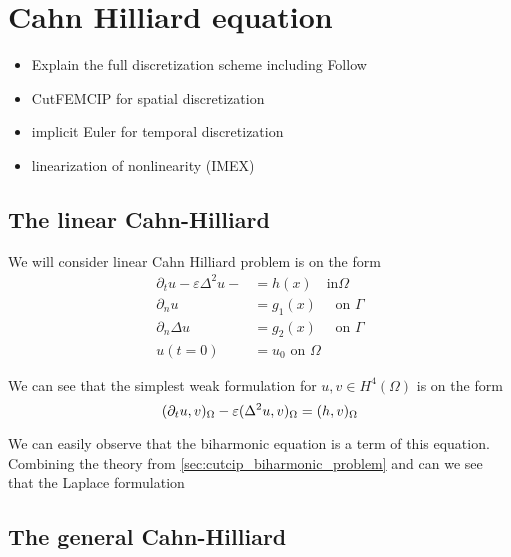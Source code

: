 
\newpage
\section{Cahn Hilliard equation }%
\label{sec:cahn_hilliard_equation}


\begin{itemize}
    \item Explain the full discretization scheme including Follow \cite{feng2007fully}
    \item CutFEMCIP for spatial discretization
    \item implicit Euler for temporal discretization
    \item linearization of nonlinearity (IMEX)
\end{itemize}


\subsection{The linear Cahn-Hilliard}%
\label{sub:the_problem}

We will consider linear Cahn Hilliard problem is on the form
\begin{equation}
\label{eq:ch_exact}
    \begin{split}
        \partial _{t} u  - \varepsilon \Delta^2   u -   & =  h(x)  \quad \text{in} \Omega \\
        \partial _{n} u & =  g_{1}(x)  \quad \text{ on } \Gamma \\
        \partial _{n} \Delta u & = g_{2}(x)  \quad \text{ on } \Gamma  \\
        u(t=0) & = u_{0}   \text{ on } \Omega
    \end{split}
\end{equation}


We can see that the simplest weak formulation for $u,v \in H^{4}( \Omega ) $ is on the form
\[
( \partial _{t}u, v )_{\Omega }  - \varepsilon ( \Delta^2 u, v)_{\Omega } = ( h,v)_{\Omega }   \\
\]


We can easily observe that the biharmonic equation is a term of this equation. Combining the theory from \ref{sec:cutcip_biharmonic_problem} and can we see that the Laplace formulation



\subsection{The general Cahn-Hilliard}%
\label{sub:the_problem}

